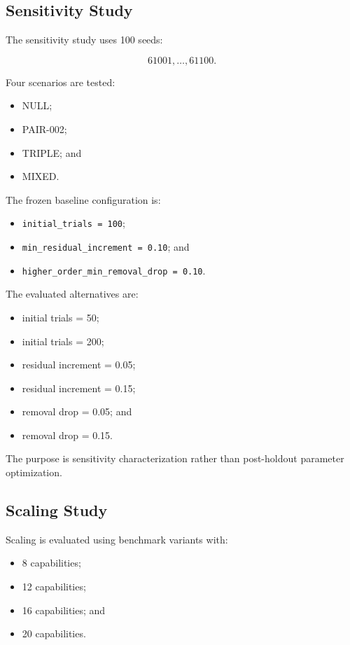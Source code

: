 \subsection{Sensitivity Study}

The sensitivity study uses 100 seeds:

\[
61001,\ldots,61100.
\]

Four scenarios are tested:

\begin{itemize}
\tightlist
\item
  NULL;
\item
  PAIR-002;
\item
  TRIPLE; and
\item
  MIXED.
\end{itemize}

The frozen baseline configuration is:

\begin{itemize}
\tightlist
\item
  \texttt{initial\_trials\ =\ 100};
\item
  \texttt{min\_residual\_increment\ =\ 0.10}; and
\item
  \texttt{higher\_order\_min\_removal\_drop\ =\ 0.10}.
\end{itemize}

The evaluated alternatives are:

\begin{itemize}
\tightlist
\item
  initial trials = 50;
\item
  initial trials = 200;
\item
  residual increment = 0.05;
\item
  residual increment = 0.15;
\item
  removal drop = 0.05; and
\item
  removal drop = 0.15.
\end{itemize}

The purpose is sensitivity characterization rather than post-holdout parameter optimization.

\subsection{Scaling Study}

Scaling is evaluated using benchmark variants with:

\begin{itemize}
\tightlist
\item
  8 capabilities;
\item
  12 capabilities;
\item
  16 capabilities; and
\item
  20 capabilities.
\end{itemize}

